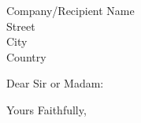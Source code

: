 \documentclass{lettear}
\def\myopening{Dear Sir or Madam}
\begin{document}
\begin{letter}{Company/Recipient Name \\ Street\\ City\\ Country}
\opening{\myopening\emdash:}
\phantom{\myopening\emdash:}%
    
\closing{Yours Faithfully,}
\end{letter}
\end{document}

